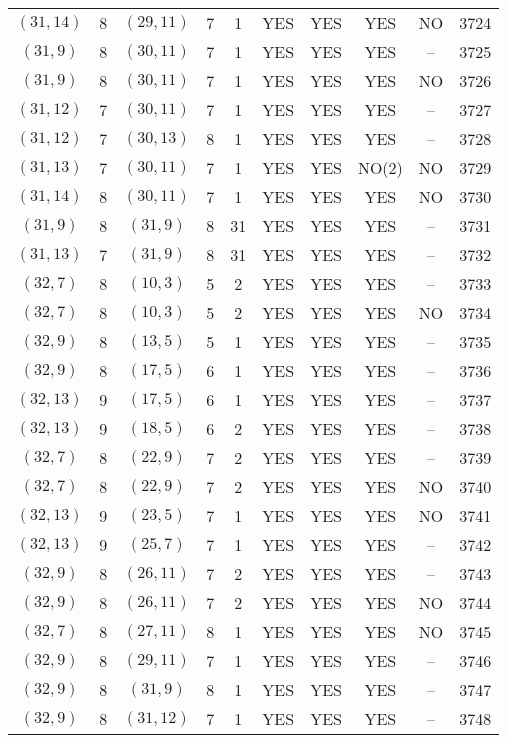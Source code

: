 \begin{longtable}{|c|c|c|c|c|c|c|c|c|c|}
$(31, 14)$ & 8 & $(29, 11)$ & 7 & 1 & YES & YES & YES & NO & 3724\\
$(31, 9)$ & 8 & $(30, 11)$ & 7 & 1 & YES & YES & YES & -- & 3725\\
$(31, 9)$ & 8 & $(30, 11)$ & 7 & 1 & YES & YES & YES & NO & 3726\\
$(31, 12)$ & 7 & $(30, 11)$ & 7 & 1 & YES & YES & YES & -- & 3727\\
$(31, 12)$ & 7 & $(30, 13)$ & 8 & 1 & YES & YES & YES & -- & 3728\\
$(31, 13)$ & 7 & $(30, 11)$ & 7 & 1 & YES & YES & NO(2) & NO & 3729\\
$(31, 14)$ & 8 & $(30, 11)$ & 7 & 1 & YES & YES & YES & NO & 3730\\
$(31, 9)$ & 8 & $(31, 9)$ & 8 & 31 & YES & YES & YES & -- & 3731\\
$(31, 13)$ & 7 & $(31, 9)$ & 8 & 31 & YES & YES & YES & -- & 3732\\
$(32, 7)$ & 8 & $(10, 3)$ & 5 & 2 & YES & YES & YES & -- & 3733\\
$(32, 7)$ & 8 & $(10, 3)$ & 5 & 2 & YES & YES & YES & NO & 3734\\
$(32, 9)$ & 8 & $(13, 5)$ & 5 & 1 & YES & YES & YES & -- & 3735\\
$(32, 9)$ & 8 & $(17, 5)$ & 6 & 1 & YES & YES & YES & -- & 3736\\
$(32, 13)$ & 9 & $(17, 5)$ & 6 & 1 & YES & YES & YES & -- & 3737\\
$(32, 13)$ & 9 & $(18, 5)$ & 6 & 2 & YES & YES & YES & -- & 3738\\
$(32, 7)$ & 8 & $(22, 9)$ & 7 & 2 & YES & YES & YES & -- & 3739\\
$(32, 7)$ & 8 & $(22, 9)$ & 7 & 2 & YES & YES & YES & NO & 3740\\
$(32, 13)$ & 9 & $(23, 5)$ & 7 & 1 & YES & YES & YES & NO & 3741\\
$(32, 13)$ & 9 & $(25, 7)$ & 7 & 1 & YES & YES & YES & -- & 3742\\
$(32, 9)$ & 8 & $(26, 11)$ & 7 & 2 & YES & YES & YES & -- & 3743\\
$(32, 9)$ & 8 & $(26, 11)$ & 7 & 2 & YES & YES & YES & NO & 3744\\
$(32, 7)$ & 8 & $(27, 11)$ & 8 & 1 & YES & YES & YES & NO & 3745\\
$(32, 9)$ & 8 & $(29, 11)$ & 7 & 1 & YES & YES & YES & -- & 3746\\
$(32, 9)$ & 8 & $(31, 9)$ & 8 & 1 & YES & YES & YES & -- & 3747\\
$(32, 9)$ & 8 & $(31, 12)$ & 7 & 1 & YES & YES & YES & -- & 3748\\

\end{longtable}
